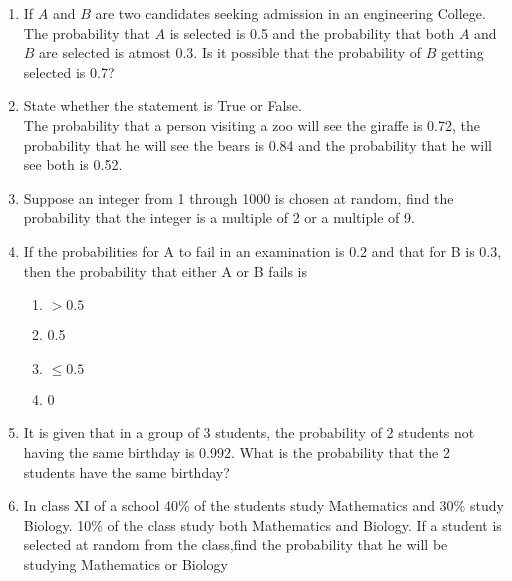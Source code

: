 \begin{enumerate}[label=\thesubsection.\arabic*,ref=\thesubsection.\theenumi]
\item If $A$ and $B$ are two candidates seeking admission in an engineering College. The probability that $A$ is selected is 0.5 and the probability that both $A$ and $B$ are selected is atmost 0.3. Is it possible that the probability of $B$ getting selected is 0.7?\\
\solution 

\item State whether the statement is True or False.\\
The probability that a person visiting a zoo will see the giraffe is 0.72, the probability that he will see the bears is 0.84 and the probability that he will see both is 0.52.\\
\solution

%
\item Suppose an integer from 1 through 1000 is chosen at random, find the probability that the integer is a multiple of 2 or a multiple of 9.
\\
\solution

\item If the probabilities for A to fail in an examination is 0.2 and that for B is 0.3, then
the probability that either A or B fails is
		\vspace{-3mm}
\begin{multicols}{4}
\begin{enumerate}
\item $>0.5$
\item 0.5
\item $\le 0.5$
\item 0
\end{enumerate}
\end{multicols}
		\vspace{-3mm}
\solution

\item It is given that in a group of 3 students, the probability of 2 students not having the same birthday is 0.992. What is the probability that the 2 students have the same birthday?
	\\
\solution

%
\item  In class XI of a school 40\% of the students study Mathematics and 30\% study Biology. 10\% of the class study both Mathematics and Biology. If a student is selected at random from the class,find the probability that he will be studying Mathematics or Biology
	\\

\end{enumerate}
